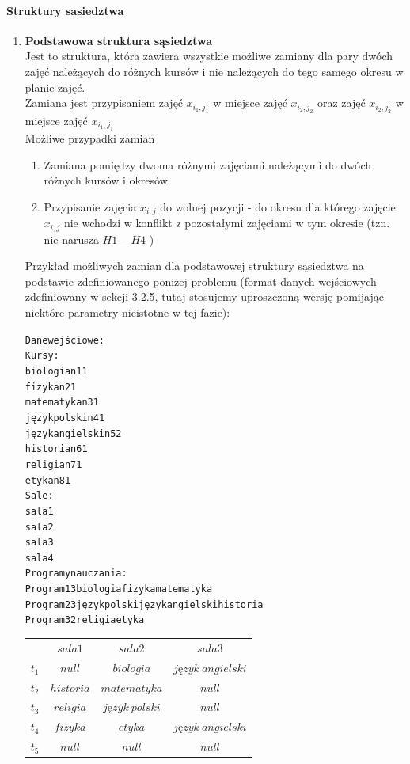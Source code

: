 \paragraph{Struktury sasiedztwa}
\begin{enumerate}
\item \textbf{Podstawowa struktura sąsiedztwa} \\
Jest to struktura, która zawiera wszystkie możliwe zamiany dla pary dwóch zajęć należących do różnych kursów i nie należących do tego samego okresu w planie zajęć. \\
Zamiana jest przypisaniem zajęć $x_{i_{1},j_{1}}$ w miejsce zajęć ${x_{i_{2}, j_{2}}}$ oraz zajęć ${x_{i_{2}, j_{2}}}$ w miejsce zajęć $x_{i_{1},j_{1}}$ \\
Możliwe przypadki zamian

\begin{enumerate}
\item Zamiana pomiędzy dwoma różnymi zajęciami należącymi do dwóch różnych kursów i okresów
\item Przypisanie zajęcia ${x_{i,j}}$ do wolnej pozycji - do okresu dla którego zajęcie ${x_{i,j}}$ nie wchodzi w konflikt z pozostałymi zajęciami w tym okresie (tzn. nie narusza ${H1-H4}$ )
\end{enumerate}
Przykład możliwych zamian dla podstawowej struktury sąsiedztwa na podstawie zdefiniowanego poniżej problemu (format danych wejściowych zdefiniowany w sekcji 3.2.5, tutaj stosujemy uproszczoną wersję pomijając niektóre parametry nieistotne w tej fazie):
\begin{alltt}
Dane wejściowe:
Kursy: 
biologia n1 1
fizyka n2 1
matematyka n3 1
język polski n4 1
język angielski n5 2
historia n6 1
religia n7 1
etyka n8 1
Sale: 
sala1
sala2
sala3
sala4
Programy nauczania:
Program1 3 biologia fizyka matematyka
Program2 3 język polski język angielski historia
Program3 2 religia etyka
\end{alltt}

\begin{table}[H]
\begin{center}
\begin{tabular}{ r|c|c|c| }
\multicolumn{1}{r}{}
 &  \multicolumn{1}{c}{$sala1$}
 & \multicolumn{1}{c}{$sala2$} 
 & \multicolumn{1}{c}{$sala3$} 
 \\
\cline{2-4}
$t_{1}$ & $null$ & $biologia$ & $język\ angielski$  \\
\cline{2-4}
$t_{2}$ & $historia$ & $matematyka$  & $null$ \\
\cline{2-4}
$t_{3}$ & $religia$ & $język\ polski$  & $null$ \\
\cline{2-4}
$t_{4}$ & $fizyka$ & $etyka$ & $język\ angielski$ \\
\cline{2-4}
$t_{5}$ & $null$ & $null$ & $null$ \\
\cline{2-4}
\end{tabular}
\end{center}


\end{table}
\end{enumerate}

